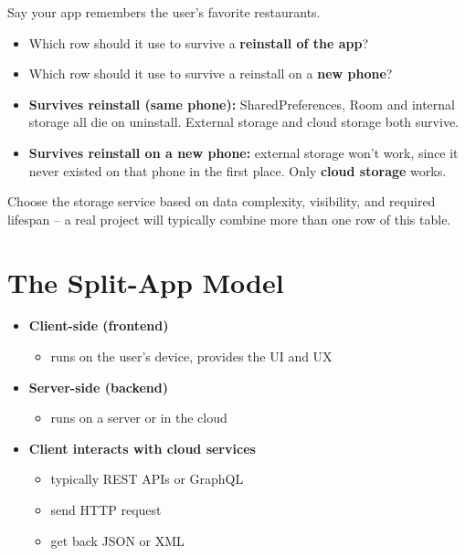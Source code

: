 \begin{exbox}[title=Which row survives what?]
Say your app remembers the user's favorite restaurants.
\begin{itemize}
  \item Which row should it use to survive a \textbf{reinstall of the app}?
  \item Which row should it use to survive a reinstall on a \textbf{new phone}?
\end{itemize}
\end{exbox}

\begin{keybox}[title=Answer]
\begin{itemize}
  \item \textbf{Survives reinstall (same phone):} SharedPreferences, Room and internal storage all die on uninstall. External storage and cloud storage both survive.
  \item \textbf{Survives reinstall on a new phone:} external storage won't work, since it never existed on that phone in the first place. Only \textbf{cloud storage} works.
\end{itemize}
Choose the storage service based on data complexity, visibility, and required lifespan -- a real project will typically combine more than one row of this table.
\end{keybox}

\section{The Split-App Model}

\begin{itemize}
  \item \textbf{Client-side (frontend)}
  \begin{itemize}
    \item runs on the user's device, provides the UI and UX
  \end{itemize}
  \item \textbf{Server-side (backend)}
  \begin{itemize}
    \item runs on a server or in the cloud
  \end{itemize}
  \item \textbf{Client interacts with cloud services}
  \begin{itemize}
    \item typically REST APIs or GraphQL
    \item send HTTP request
    \item get back JSON or XML
  \end{itemize}
\end{itemize}

